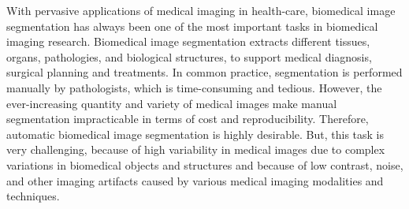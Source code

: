 \documentclass[10pt,twocolumn,letterpaper]{article}
\begin{document}
With pervasive applications of medical imaging in health-care, biomedical image segmentation has always been one of the most important tasks in biomedical imaging research.
Biomedical image segmentation extracts different tissues, organs, pathologies, and biological structures, to support medical diagnosis, surgical planning and treatments.
In common practice, segmentation is performed manually by pathologists, which is time-consuming and tedious.
However, the ever-increasing quantity and variety of medical images make manual segmentation impracticable in terms of cost and reproducibility.
Therefore, automatic biomedical image segmentation is highly desirable.
But, this task is very challenging,
because of high variability in medical images due to complex variations in biomedical objects and structures and because of low contrast, noise, and other imaging artifacts caused by various medical imaging modalities and techniques.

\end{document}
